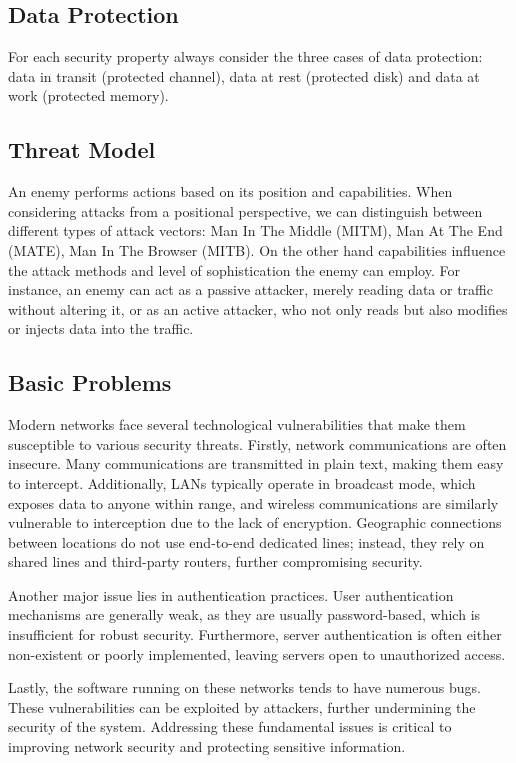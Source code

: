 \subsection{Data Protection}
For each security property always consider the three cases of data protection: data in transit (protected channel), data at rest (protected disk) and data at work (protected memory).

\subsection{Threat Model}
An enemy performs actions based on its position and capabilities. When considering attacks from a positional perspective, we can distinguish between different types of attack vectors: Man In The Middle (MITM), Man At The End (MATE), Man In The Browser (MITB). On the other hand capabilities influence the attack methods and level of sophistication the enemy can employ. For instance, an enemy can act as a passive attacker, merely reading data or traffic without altering it, or as an active attacker, who not only reads but also modifies or injects data into the traffic.

\subsection{Basic Problems}
Modern networks face several technological vulnerabilities that make them susceptible to various security threats. Firstly, network communications are often insecure. Many communications are transmitted in plain text, making them easy to intercept. Additionally, LANs typically operate in broadcast mode, which exposes data to anyone within range, and wireless communications are similarly vulnerable to interception due to the lack of encryption. Geographic connections between locations do not use end-to-end dedicated lines; instead, they rely on shared lines and third-party routers, further compromising security.

Another major issue lies in authentication practices. User authentication mechanisms are generally weak, as they are usually password-based, which is insufficient for robust security. Furthermore, server authentication is often either non-existent or poorly implemented, leaving servers open to unauthorized access.

Lastly, the software running on these networks tends to have numerous bugs. These vulnerabilities can be exploited by attackers, further undermining the security of the system. Addressing these fundamental issues is critical to improving network security and protecting sensitive information.

